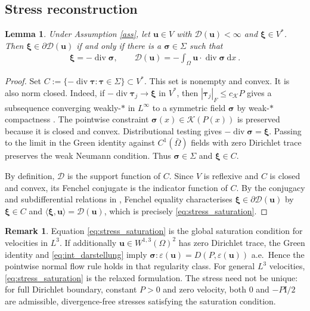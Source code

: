 \documentclass{article}
\newtheorem{lemma}[theorem]{Lemma}
\theoremstyle{definition}
\newtheorem{remark}[definition]{Remark}
\newcommand{\bfu}{\boldsymbol{u}}
\newcommand{\bfsigma}{\boldsymbol{\sigma}}
\newcommand{\bftau}{\boldsymbol{\tau}}
\newcommand{\bfxi}{\boldsymbol{\xi}}
\newcommand{\bfI}{\boldsymbol{\mathrm{I}}}
\newcommand{\K}{\mathcal{K}}
\newcommand{\D}{\mathcal{D}}
\newcommand{\dd}{\:\mathrm{d}}
\renewcommand\div{\operatorname{\mathrm{div}}}
\begin{document}
\subsection{Stress reconstruction}
\begin{lemma}\label{lem:stress_reconstruction}
    Under Assumption \ref{ass}, let $\bfu\in V$ with $\D(\bfu)<\infty$ and
    $\bfxi\in V^*$. Then $\bfxi\in\partial\D(\bfu)$ if and only if there is
    a $\bfsigma\in\Sigma$ such that
    \begin{align}
        \bfxi=-\div\bfsigma,\qquad
        \D(\bfu)=-\int_\Omega\bfu\cdot\div\bfsigma\dd x \ .
        \label{eq:stress_saturation}
    \end{align}
\end{lemma}
\begin{proof}
    Set $C:=\{-\div\bftau:\bftau\in\Sigma\}\subset V^*$. This set is
    nonempty and convex. It is also norm closed. Indeed, if
    $-\div\bftau_j\rightarrow\bfxi$ in $V^*$, then
    $|\bftau_j|_F\leq c_\K P$ gives a subsequence converging weakly-$\ast$
    in $L^\infty$ to a symmetric field $\bfsigma$ by weak-$\ast$ compactness
    \cite[Chapter 3]{Br11}. The pointwise constraint
    $\bfsigma(x)\in\K(P(x))$ is preserved because it is closed and convex.
    Distributional testing gives $-\div\bfsigma=\bfxi$. Passing to the limit
    in the Green identity against $C^1(\bar\Omega)$ fields with zero
    Dirichlet trace preserves the weak Neumann condition. Thus
    $\bfsigma\in\Sigma$ and $\bfxi\in C$.

    By definition, $\D$ is the support function of $C$. Since $V$ is
    reflexive and $C$ is closed and convex, its Fenchel conjugate is the
    indicator function of $C$. By the conjugacy and subdifferential relations
    in \cite[Chapter I]{ET99}, Fenchel equality characterises
    $\bfxi\in\partial\D(\bfu)$ by $\bfxi\in C$ and
    $\langle\bfxi,\bfu\rangle=\D(\bfu)$, which is precisely
    \eqref{eq:stress_saturation}.
\end{proof}

\begin{remark}
    Equation \eqref{eq:stress_saturation} is the global saturation condition
    for velocities in $L^3$. If additionally
    $\bfu\in W^{1,3}(\Omega)^2$ has zero Dirichlet trace, the Green
    identity and \eqref{eq:int_darstellung} imply
    $\bfsigma:\varepsilon(\bfu)=D(P,\varepsilon(\bfu))$ a.e.\ Hence the
    pointwise normal flow rule holds in that regularity class. For general
    $L^3$ velocities, \eqref{eq:stress_saturation} is the relaxed formulation.
    The stress need not be unique: for full Dirichlet boundary, constant
    $P>0$ and zero velocity, both $0$ and $-P\bfI/2$ are admissible,
    divergence-free stresses satisfying the saturation condition.
\end{remark}
\end{document}
